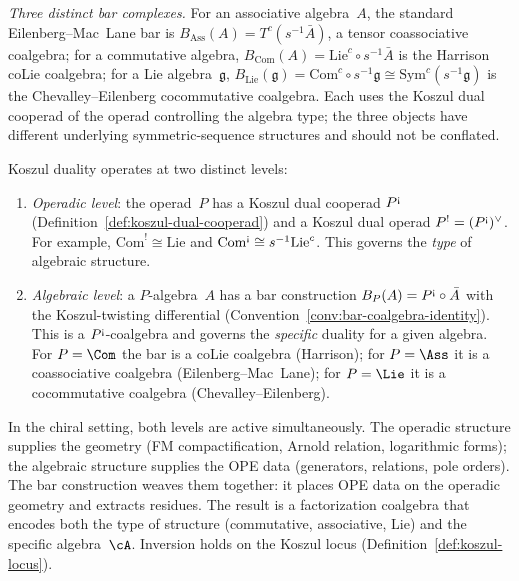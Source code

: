 \begin{example}
\emph{Three distinct bar complexes.}
For an associative algebra~$A$, the standard
Eilenberg--Mac~Lane bar is
$B_{\mathrm{Ass}}(A) = T^c(s^{-1}\bar A)$, a tensor
coassociative coalgebra; for a commutative algebra,
$B_{\mathrm{Com}}(A) = \mathrm{Lie}^c \circ s^{-1}\bar A$ is the
Harrison coLie coalgebra; for a Lie algebra~$\mathfrak{g}$,
$B_{\mathrm{Lie}}(\mathfrak{g}) = \mathrm{Com}^c \circ s^{-1}\mathfrak{g}
\cong \mathrm{Sym}^c(s^{-1}\mathfrak{g})$ is the
Chevalley--Eilenberg cocommutative coalgebra. Each uses the
Koszul dual cooperad of the operad controlling the algebra type;
the three objects have different underlying symmetric-sequence
structures and should not be conflated.
\end{example}

\begin{remark}
\label{rem:operadic-vs-algebraic-kd}
Koszul duality operates at two distinct levels:
\begin{enumerate}[label=\textup{(\alph*)}]
\item \emph{Operadic level}: the operad~$P$ has a Koszul dual
 cooperad $P^{\text{\textexclamdown}}$
 (Definition~\ref{def:koszul-dual-cooperad}) and a Koszul dual
 operad $P^! = (P^{\text{\textexclamdown}})^\vee$. For example,
 $\mathrm{Com}^! \cong \mathrm{Lie}$ and
 $\mathrm{Com}^{\text{\textexclamdown}} \cong s^{-1}\mathrm{Lie}^c$.
 This governs the \emph{type} of algebraic structure.
\item \emph{Algebraic level}: a $P$-algebra~$A$ has a bar
 construction
 $B_P(A) = P^{\text{\textexclamdown}} \circ \bar{A}$ with the
 Koszul-twisting differential
 (Convention~\ref{conv:bar-coalgebra-identity}). This is a
 $P^{\text{\textexclamdown}}$-coalgebra and governs the
 \emph{specific} duality for a given algebra. For $P = \Com$
 the bar is a coLie coalgebra (Harrison); for $P = \Ass$ it is
 a coassociative coalgebra (Eilenberg--Mac~Lane); for
 $P = \Lie$ it is a cocommutative coalgebra
 (Chevalley--Eilenberg).
\end{enumerate}
In the chiral setting, both levels are active simultaneously.
The operadic structure supplies the geometry
(FM compactification, Arnold relation, logarithmic forms);
the algebraic structure supplies the OPE data (generators,
relations, pole orders). The bar construction weaves them
together: it places OPE data on the operadic geometry and
extracts residues. The result is a factorization coalgebra
that encodes both the type of structure (commutative,
associative, Lie) and the specific algebra~$\cA$.
Inversion holds on the Koszul locus
(Definition~\ref{def:koszul-locus}).
\end{remark}

